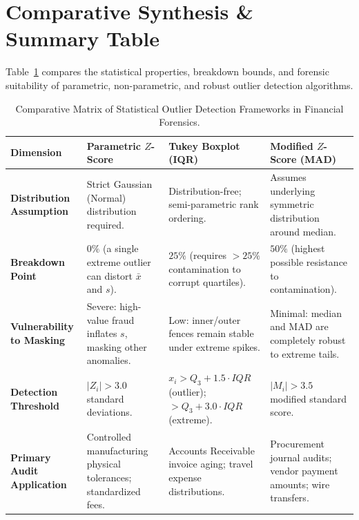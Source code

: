 \section{Comparative Synthesis \& Summary Table}

Table~\ref{tab:comparison_outliers} compares the statistical properties, breakdown bounds, and forensic suitability of parametric, non-parametric, and robust outlier detection algorithms.

\begin{table}[htbp]
\centering
\small
\begin{tabularx}{\textwidth}{lXXX}
\toprule
\textbf{Dimension} & \textbf{Parametric $Z$-Score} & \textbf{Tukey Boxplot (IQR)} & \textbf{Modified $Z$-Score (MAD)} \\
\midrule
\textbf{Distribution Assumption} & Strict Gaussian (Normal) distribution required. & Distribution-free; semi-parametric rank ordering. & Assumes underlying symmetric distribution around median. \\
\addlinespace
\textbf{Breakdown Point} & $0\%$ (a single extreme outlier can distort $\bar{x}$ and $s$). & $25\%$ (requires $>25\%$ contamination to corrupt quartiles). & $50\%$ (highest possible resistance to contamination). \\
\addlinespace
\textbf{Vulnerability to Masking} & Severe: high-value fraud inflates $s$, masking other anomalies. & Low: inner/outer fences remain stable under extreme spikes. & Minimal: median and MAD are completely robust to extreme tails. \\
\addlinespace
\textbf{Detection Threshold} & $|Z_i| > 3.0$ standard deviations. & $x_i > Q_3 + 1.5 \cdot IQR$ (outlier); $> Q_3 + 3.0 \cdot IQR$ (extreme). & $|M_i| > 3.5$ modified standard score. \\
\addlinespace
\textbf{Primary Audit Application} & Controlled manufacturing physical tolerances; standardized fees. & Accounts Receivable invoice aging; travel expense distributions. & Procurement journal audits; vendor payment amounts; wire transfers. \\
\bottomrule
\end{tabularx}
\caption{Comparative Matrix of Statistical Outlier Detection Frameworks in Financial Forensics.}
\label{tab:comparison_outliers}
\end{table}

